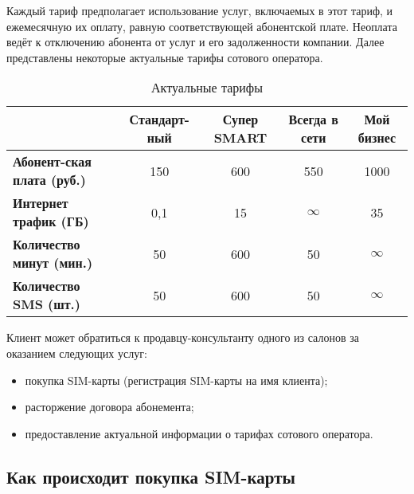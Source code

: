Каждый тариф предполагает использование услуг, включаемых в этот тариф, и ежемесячную их оплату, равную соответствующей абонентской плате. Неоплата ведёт к отключению абонента от услуг и его задолженности компании. Далее представлены некоторые актуальные тарифы сотового оператора.

\begin{table}[H]
    \label{tab:actual-tariffs}
    \caption{Актуальные тарифы}
    \setlength{\parskip}{1.0ex}
    \renewcommand{\arraystretch}{1.5}
    \renewcommand{\tabularxcolumn}[1]{m{#1}}
    \begin{tabularx}{\textwidth}{|X|C|C|C|C|}
        \hline
                                           & \textbf{Стандарт-ный} & \textbf{Супер SMART} & \textbf{Всегда в сети} & \textbf{Мой бизнес} \\ \hline
        \textbf{Абонент-ская плата (руб.)} & 150                   & 600                  & 550                    & 1000                \\ \hline
        \textbf{Интернет трафик (ГБ)}      & 0,1                   & 15                   & $\infty$               & 35                  \\ \hline
        \textbf{Количество минут (мин.)}   & 50                    & 600                  & 50                     & $\infty$            \\ \hline
        \textbf{Количество SMS (шт.)}      & 50                    & 600                  & 50                     & $\infty$            \\ \hline
    \end{tabularx}
\end{table}



Клиент может обратиться к продавцу-консультанту одного из салонов за оказанием следующих услуг:
\begin{itemize}
    \item покупка SIM-карты (регистрация SIM-карты на имя клиента);
    \item расторжение договора абонемента;
    \item предоставление актуальной информации о тарифах сотового оператора.
\end{itemize}


\subsection{Как происходит покупка SIM-карты}


